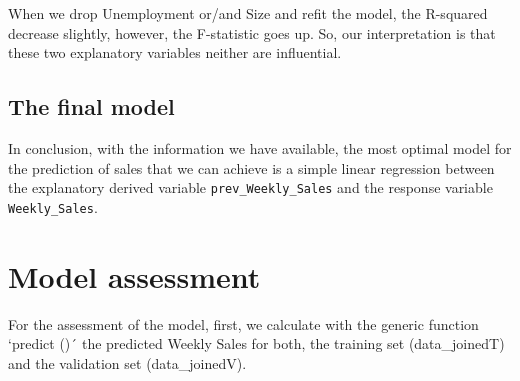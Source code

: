\documentclass[11pt,]{article}
\newenvironment{Shaded}{\begin{snugshade}}{\end{snugshade}}
\newcommand{\KeywordTok}[1]{\textcolor[rgb]{0.13,0.29,0.53}{\textbf{{#1}}}}
\newcommand{\DataTypeTok}[1]{\textcolor[rgb]{0.13,0.29,0.53}{{#1}}}
\newcommand{\StringTok}[1]{\textcolor[rgb]{0.31,0.60,0.02}{{#1}}}
\newcommand{\CommentTok}[1]{\textcolor[rgb]{0.56,0.35,0.01}{\textit{{#1}}}}
\newcommand{\NormalTok}[1]{{#1}}
\begin{document}
When we drop Unemployment or/and Size and refit the model, the R-squared
decrease slightly, however, the F-statistic goes up. So, our
interpretation is that these two explanatory variables neither are
influential.

\begin{Shaded}
\end{Shaded}

\pagebreak

\subsection{The final model}\label{the-final-model}

In conclusion, with the information we have available, the most optimal
model for the prediction of sales that we can achieve is a simple linear
regression between the explanatory derived variable
\texttt{prev\_Weekly\_Sales} and the response variable
\texttt{Weekly\_Sales}.

\begin{Shaded}
\end{Shaded}

\section{Model assessment}\label{model-assessment}

For the assessment of the model, first, we calculate with the generic
function `predict ()´ the predicted Weekly Sales for both, the training
set (data\_joinedT) and the validation set (data\_joinedV).

\begin{Shaded}
\end{Shaded}
\end{document}
